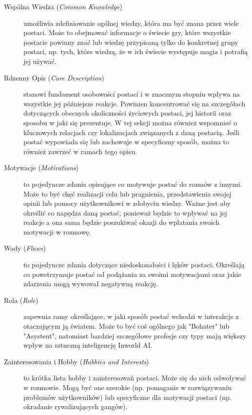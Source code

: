 \begin{description}

    \item[Wspólna Wiedza (\textit{Common Knowledge})] umożliwia zdefiniowanie ogólnej wiedzy, która ma być znana przez wiele
          postaci. Może to obejmować informacje o świecie gry, które wszystkie postacie powinny znać lub wiedzę
          przypisaną tylko do konkretnej grupy postaci, np. tych, które wiedzą, że w ich świecie występuje magia
          i potrafią jej używać\cite{inworld_docs}.

    \item[Rdzenny Opis (\textit{Core Description})] stanowi fundament osobowości postaci i w znacznym stopniu wpływa na
          wszystkie jej późniejsze reakcje. Powinien koncentrować się na szczegółach dotyczących obecnych
          okoliczności życiowych postaci, jej historii oraz sposobu w jaki się prezentuje. W tej sekcji
          można również wspomnieć o kluczowych relacjach czy lokalizacjach
          związanych z daną postacią. Jeśli postać wypowiada się lub zachowuje w specyficzny sposób,
          można to również zawrzeć w ramach tego opisu\cite{inworld_docs}.

    \item[Motywacje (\textit{Motivations})] to pojedyncze zdania opisujące co motywuje postać do
          rozmów z innymi. Może to być chęć realizacji celu lub pragnienia, przedstawienia swojej opinii lub
          pomocy użytkownikowi w zdobyciu wiedzy. Ważne jest aby określić co napędza daną postać, ponieważ
          będzie to wpływać na jej reakcje a ona sama będzie poszukiwać okazji do wplatania swoich motywacji w rozmowę\cite{inworld_docs}.

    \item[Wady (\textit{Flaws})] to pojedyncze zdania dotyczące niedoskonałości i lęków postaci. Określają
          co powstrzymuje postać od podążania za swoimi motywacjami oraz jakie zdarzenia mogą wywował negatywną
          reakcję\cite{inworld_docs}.

    \item[Rola (\textit{Role})] zapewnia ramy określające, w jaki sposób postać wchodzi w interakcje z otaczającym ją
          światem. Może to być coś ogólnego jak "Bohater" lub "Asystent", natomiast bardziej szczegółowe
          profesje czy typy mają większy wpływ na sztuczną inteligencję Inworld AI\cite{inworld_docs}.

    \item[Zainteresowania i Hobby (\textit{Hobbies and Interests})] to krótka lista hobby i zainteresowań postaci. Może
          się do nich odwoływać w rozmowie. Mogą być one szerokie (np. pomaganie w rozwiązywaniu problemów
          użytkowników) lub specyficzne dla motywacji postaci (np. okradanie rywalizujących gangów)\cite{inworld_docs}.


\end{description}
